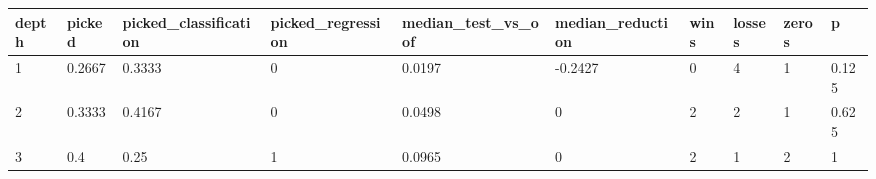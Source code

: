 \begin{tabular}{llllllllll}
\toprule
depth & picked & picked\_classification & picked\_regression & median\_test\_vs\_oof & median\_reduction & wins & losses & zeros & p \\
\midrule
1 & 0.2667 & 0.3333 & 0 & 0.0197 & -0.2427 & 0 & 4 & 1 & 0.125 \\
2 & 0.3333 & 0.4167 & 0 & 0.0498 & 0 & 2 & 2 & 1 & 0.625 \\
3 & 0.4 & 0.25 & 1 & 0.0965 & 0 & 2 & 1 & 2 & 1 \\
\bottomrule
\end{tabular}
